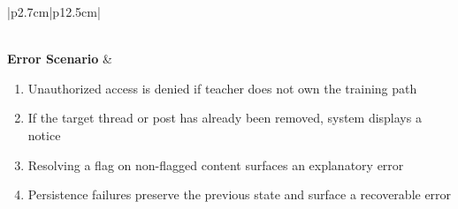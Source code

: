 \begin{table}[H]
\begin{tabular}{|p{2.7cm}|p{12.5cm}|}
\begin{minipage}[t]{\linewidth}
\begin{enumerate}[topsep=0pt,itemsep=1pt,parsep=0pt,partopsep=0pt]
            \end{enumerate}
        \end{minipage} \\
        \hline
        \textbf{Error Scenario} & \begin{minipage}[t]{\linewidth}
            \begin{enumerate}[topsep=0pt,itemsep=1pt,parsep=0pt,partopsep=0pt]
                \item Unauthorized access is denied if teacher does not own the training path
                \item If the target thread or post has already been removed, system displays a notice
                \item Resolving a flag on non-flagged content surfaces an explanatory error
                \item Persistence failures preserve the previous state and surface a recoverable error
            \end{enumerate}
        \end{minipage} \\
        \hline
    \end{tabular}
    \label{tab:teacher-forum-moderation}
\end{table}


